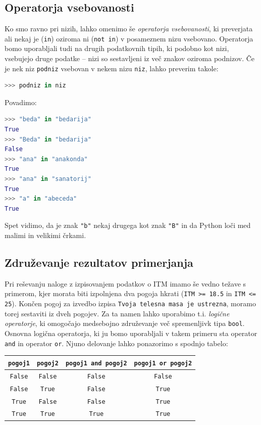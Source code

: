 \subsection{Operatorja vsebovanosti}

Ko smo ravno pri nizih, lahko omenimo še \emph{operatorja vsebovanosti}, ki preverjata ali nekaj je (\texttt{in}) oziroma ni (\texttt{not in}) v posameznem nizu vsebovano. Operatorja bomo uporabljali tudi na drugih podatkovnih tipih, ki podobno kot nizi, vsebujejo druge podatke -- nizi so sestavljeni iz več znakov oziroma podnizov. Če je nek niz \texttt{podniz} vsebovan v nekem nizu \texttt{niz}, lahko preverim takole:
\begin{lstlisting}[language=Python]
>>> podniz in niz
\end{lstlisting}
Povadimo:
\begin{lstlisting}[language=Python]
>>> "beda" in "bedarija"
True
>>> "Beda" in "bedarija"
False
>>> "ana" in "anakonda"
True
>>> "ana" in "sanatorij"
True
>>> "a" in "abeceda"
True
\end{lstlisting}
Spet vidimo, da je znak \texttt{"b"} nekaj drugega kot znak \texttt{"B"} in da Python loči med malimi in velikimi črkami.

\subsection{Združevanje rezultatov primerjanja}

Pri reševanju naloge z izpisovanjem podatkov o ITM imamo še vedno težave s primerom, kjer morata biti izpolnjena dva pogoja hkrati (\texttt{ITM >= 18.5} in \texttt{ITM <= 25}). Končen pogoj za izvedbo izpisa \texttt{Tvoja telesna masa je ustrezna}, moramo torej sestaviti iz dveh pogojev. Za ta namen lahko uporabimo t.i. \emph{logične operatorje}, ki omogočajo medsebojno združevanje več spremenljivk tipa \texttt{bool}. Osnovna logična operatorja, ki ju bomo uporabljali v takem primeru sta operator \texttt{and} in operator \texttt{or}. Njuno delovanje lahko ponazorimo s spodnjo tabelo:

\begin{tabular}{cc|cc}
     \texttt{pogoj1} & \texttt{pogoj2}  & \texttt{pogoj1 and pogoj2} & \texttt{pogoj1 or pogoj2}\\
     \hline
     \texttt{False} & \texttt{False} & \texttt{False} & \texttt{False} \\
     \texttt{False} & \texttt{True} & \texttt{False} & \texttt{True} \\
     \texttt{True} & \texttt{False} & \texttt{False} & \texttt{True} \\
     \texttt{True} & \texttt{True} & \texttt{True} & \texttt{True} \\
\end{tabular}

